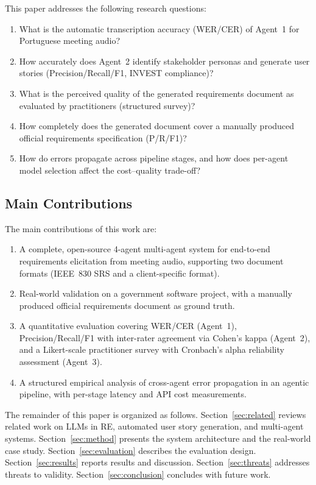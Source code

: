 \documentclass[sigconf]{acmart}
\begin{document}
This paper addresses the following research questions:

\begin{enumerate}[label=\textbf{RQ\arabic*.}]
  \item What is the automatic transcription accuracy (WER/CER) of
        Agent~1 for Portuguese meeting audio?
  \item How accurately does Agent~2 identify stakeholder personas and
        generate user stories (Precision/Recall/F1, INVEST compliance)?
  \item What is the perceived quality of the generated requirements
        document as evaluated by practitioners (structured survey)?
  \item How completely does the generated document cover a manually
        produced official requirements specification (P/R/F1)?
  \item How do errors propagate across pipeline stages, and how does
        per-agent model selection affect the cost--quality trade-off?
\end{enumerate}

\subsection{Main Contributions}

The main contributions of this work are:

\begin{enumerate}
  \item A complete, open-source 4-agent multi-agent system for
        end-to-end requirements elicitation from meeting audio,
        supporting two document formats (IEEE~830 SRS and a
        client-specific format).
  \item Real-world validation on a government software project, with a
        manually produced official requirements document as ground
        truth.
  \item A quantitative evaluation covering WER/CER (Agent~1),
        Precision/Recall/F1 with inter-rater agreement via Cohen's
        kappa (Agent~2), and a Likert-scale practitioner survey with
        Cronbach's alpha reliability assessment (Agent~3).
  \item A structured empirical analysis of cross-agent error
        propagation in an agentic pipeline, with per-stage latency and
        API cost measurements.
\end{enumerate}

The remainder of this paper is organized as follows.
Section~\ref{sec:related} reviews related work on LLMs in RE,
automated user story generation, and multi-agent systems.
Section~\ref{sec:method} presents the system architecture and the
real-world case study. Section~\ref{sec:evaluation} describes the
evaluation design. Section~\ref{sec:results} reports results and
discussion. Section~\ref{sec:threats} addresses threats to validity.
Section~\ref{sec:conclusion} concludes with future work.
\end{document}

